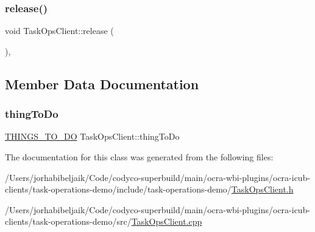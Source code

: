 \subsubsection{\texorpdfstring{release()}{release()}}
{\footnotesize\ttfamily void Task\+Ops\+Client\+::release (\begin{DoxyParamCaption}{ }\end{DoxyParamCaption})\hspace{0.3cm}{\ttfamily [protected]}, {\ttfamily [virtual]}}



\subsection{Member Data Documentation}
\hypertarget{classTaskOpsClient_a3409c4ef6b396943397b5bd9237f0a40}{}\label{classTaskOpsClient_a3409c4ef6b396943397b5bd9237f0a40} 
\subsubsection{\texorpdfstring{thing\+To\+Do}{thingToDo}}
{\footnotesize\ttfamily \hyperlink{TaskOpsClient_8h_a0140057ae3fbe1db5f5c418dfc67d9db}{T\+H\+I\+N\+G\+S\+\_\+\+T\+O\+\_\+\+DO} Task\+Ops\+Client\+::thing\+To\+Do\hspace{0.3cm}{\ttfamily [private]}}



The documentation for this class was generated from the following files\+:\begin{DoxyCompactItemize}
\item 
/\+Users/jorhabibeljaik/\+Code/codyco-\/superbuild/main/ocra-\/wbi-\/plugins/ocra-\/icub-\/clients/task-\/operations-\/demo/include/task-\/operations-\/demo/\hyperlink{TaskOpsClient_8h}{Task\+Ops\+Client.\+h}\item 
/\+Users/jorhabibeljaik/\+Code/codyco-\/superbuild/main/ocra-\/wbi-\/plugins/ocra-\/icub-\/clients/task-\/operations-\/demo/src/\hyperlink{TaskOpsClient_8cpp}{Task\+Ops\+Client.\+cpp}\end{DoxyCompactItemize}
